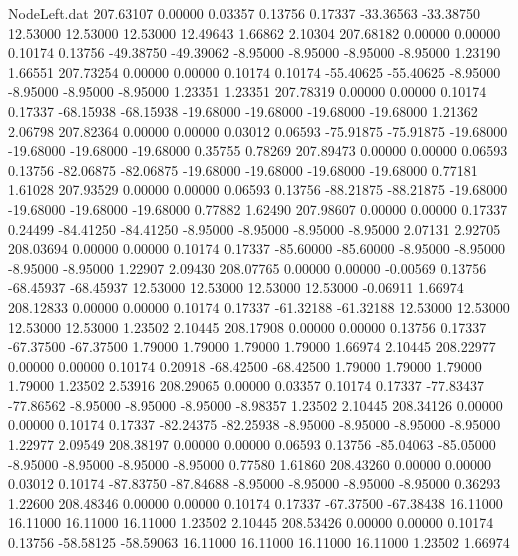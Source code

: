 \begin{filecontents}{NodeLeft.dat}
 207.63107    0.00000    0.03357     0.13756    0.17337  -33.36563  -33.38750   12.53000   12.53000   12.53000   12.49643    1.66862    2.10304
 207.68182    0.00000    0.00000     0.10174    0.13756  -49.38750  -49.39062   -8.95000   -8.95000   -8.95000   -8.95000    1.23190    1.66551
 207.73254    0.00000    0.00000     0.10174    0.10174  -55.40625  -55.40625   -8.95000   -8.95000   -8.95000   -8.95000    1.23351    1.23351
 207.78319    0.00000    0.00000     0.10174    0.17337  -68.15938  -68.15938  -19.68000  -19.68000  -19.68000  -19.68000    1.21362    2.06798
 207.82364    0.00000    0.00000     0.03012    0.06593  -75.91875  -75.91875  -19.68000  -19.68000  -19.68000  -19.68000    0.35755    0.78269
 207.89473    0.00000    0.00000     0.06593    0.13756  -82.06875  -82.06875  -19.68000  -19.68000  -19.68000  -19.68000    0.77181    1.61028
 207.93529    0.00000    0.00000     0.06593    0.13756  -88.21875  -88.21875  -19.68000  -19.68000  -19.68000  -19.68000    0.77882    1.62490
 207.98607    0.00000    0.00000     0.17337    0.24499  -84.41250  -84.41250   -8.95000   -8.95000   -8.95000   -8.95000    2.07131    2.92705
 208.03694    0.00000    0.00000     0.10174    0.17337  -85.60000  -85.60000   -8.95000   -8.95000   -8.95000   -8.95000    1.22907    2.09430
 208.07765    0.00000    0.00000    -0.00569    0.13756  -68.45937  -68.45937   12.53000   12.53000   12.53000   12.53000   -0.06911    1.66974
 208.12833    0.00000    0.00000     0.10174    0.17337  -61.32188  -61.32188   12.53000   12.53000   12.53000   12.53000    1.23502    2.10445
 208.17908    0.00000    0.00000     0.13756    0.17337  -67.37500  -67.37500    1.79000    1.79000    1.79000    1.79000    1.66974    2.10445
 208.22977    0.00000    0.00000     0.10174    0.20918  -68.42500  -68.42500    1.79000    1.79000    1.79000    1.79000    1.23502    2.53916
 208.29065    0.00000    0.03357     0.10174    0.17337  -77.83437  -77.86562   -8.95000   -8.95000   -8.95000   -8.98357    1.23502    2.10445
 208.34126    0.00000    0.00000     0.10174    0.17337  -82.24375  -82.25938   -8.95000   -8.95000   -8.95000   -8.95000    1.22977    2.09549
 208.38197    0.00000    0.00000     0.06593    0.13756  -85.04063  -85.05000   -8.95000   -8.95000   -8.95000   -8.95000    0.77580    1.61860
 208.43260    0.00000    0.00000     0.03012    0.10174  -87.83750  -87.84688   -8.95000   -8.95000   -8.95000   -8.95000    0.36293    1.22600
 208.48346    0.00000    0.00000     0.10174    0.17337  -67.37500  -67.38438   16.11000   16.11000   16.11000   16.11000    1.23502    2.10445
 208.53426    0.00000    0.00000     0.10174    0.13756  -58.58125  -58.59063   16.11000   16.11000   16.11000   16.11000    1.23502    1.66974

\end{filecontents}
